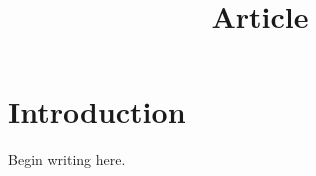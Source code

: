 \documentclass{article}
\title{Article}
\author{}
\date{}
\begin{document}
\maketitle
\section{Introduction}
Begin writing here.
\end{document}

